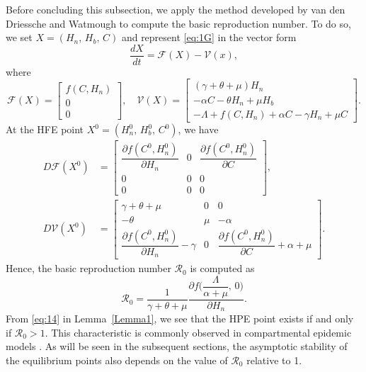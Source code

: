 \documentclass[11pt]{article}
\theoremstyle{definition}
\theoremstyle{remark}
\newtheorem{remark}[theorem]{Remark}
\numberwithin{equation}{section}
\begin{document}
Before concluding this subsection, we apply the method developed by van den Driessche and Watmough \cite{vdDriessche} to compute the basic reproduction number. 
To do so, we set $X = (H_n,\,H_b,\,C)$ and represent \eqref{eq:1G} in the vector form
\begin{equation*}
    \dfrac{dX}{dt} = \mathcal{F}(X) - \mathcal{V}(x),
\end{equation*}
where
\begin{equation*}
\mathcal{F}(X) =
\begin{bmatrix}
f(C, H_n)\\[2pt]0\\[2pt]0
\end{bmatrix}, \quad
\mathcal{V}(X) =
\begin{bmatrix}
(\gamma + \theta + \mu)H_n\\[2pt]
-\alpha C - \theta H_n + \mu H_b\\[2pt]
-\Lambda + f(C, H_n) + \alpha C - \gamma H_n + \mu C
\end{bmatrix}.
\end{equation*}
At the HFE point $X^0 = (H_n^0,\,H_b^0,\,C^0)$, we have
\begin{equation*}
\begin{split}
D\mathcal{F}(X^0) &= 
\begin{bmatrix}
\dfrac{\partial f(C^0, H_n^0)}{\partial H_n}&0&\dfrac{\partial f(C^0, H_n^0)}{\partial C}\\[4pt]
0&0&0\\[4pt]
0&0&0
\end{bmatrix},\\
D\mathcal{V}(X^0) &=
\begin{bmatrix}
\gamma + \theta + \mu&0&0\\[4pt]
-\theta&\mu&-\alpha\\[4pt]
\dfrac{\partial f(C^0, H_n^0)}{\partial H_n} - \gamma&0&\dfrac{\partial f(C^0, H_n^0)}{\partial C} + \alpha + \mu
\end{bmatrix}.
\end{split}
\end{equation*}
Hence, the basic reproduction number $\mathcal{R}_0$ is computed as
\begin{equation*}
      \mathcal{R}_0 = \dfrac{1}{\gamma + \theta + \mu}\dfrac{\partial f\bigg(\dfrac{\Lambda}{\alpha + \mu},\,0\bigg)}{\partial H_n}.
\end{equation*}
From \eqref{eq:14} in Lemma~\ref{Lemma1}, we see that the HPE point exists if and only if $\mathcal{R}_0>1$. 
This characteristic is commonly observed in compartmental epidemic models \cite{Allen, Brauer, Martcheva}.
As will be seen in the subsequent sections, the asymptotic stability of the equilibrium points also depends on the value of $\mathcal{R}_0$ relative to 1.
\end{document}
